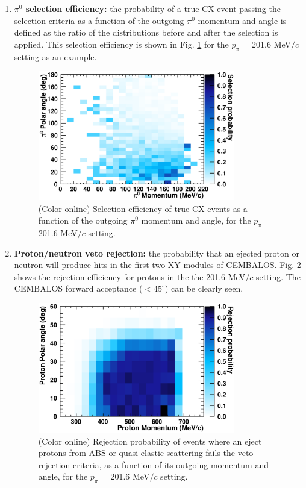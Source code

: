 \begin{enumerate}
\item{{\bf $\pi^0$ selection efficiency:} the probability of a true CX event passing the selection criteria as a function of the outgoing $\pi^0$ momentum and angle is defined as the ratio of the distributions before and after the selection is applied. This selection efficiency is shown in Fig. \ref{fig:pi0_selection} for the $p_{\pi}$ = 201.6 MeV$/c$ setting as an example.}

\begin{figure}[h]
 \includegraphics[width=86mm]{figures/Pi0SelectionEfficiency_200.eps}
 \caption{(Color online) Selection efficiency of true CX events as a function of the outgoing $\pi^{0}$ momentum and angle, for the $p_{\pi}$ = 201.6 MeV$/c$ setting.}
 \label{fig:pi0_selection}
\end{figure}

\item{{\bf Proton/neutron veto rejection:} the probability that an ejected proton or neutron will produce hits in the first two XY modules of CEMBALOS. Fig. \ref{fig:proton_rejection} shows the rejection efficiency for protons in the the 201.6 MeV$/c$ setting. The CEMBALOS forward acceptance ($<45^{\circ}$) can be clearly seen.}

\begin{figure}[h]
 \includegraphics[width=86mm]{figures/ProtonRejectionEfficiency_200.eps}
 \caption{(Color online) Rejection probability of events where an eject protons from ABS or quasi-elastic scattering fails the veto rejection criteria, as a function of its outgoing  momentum and angle, for the $p_{\pi}$ = 201.6 MeV$/c$ setting.}
 \label{fig:proton_rejection}
\end{figure}


\end{enumerate}
